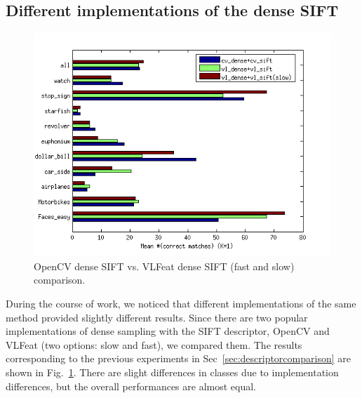 \documentclass[review]{elsarticle}
\begin{document}
%
\subsection{Different implementations of the dense {SIFT}}
%
%
\begin{figure}[h]
  \begin{center}
    \includegraphics[width=0.6\linewidth]{resources/antti_results/fast_VS_slow_vlfeat/metaPar_NumOfMatchAvgMean.png}
\caption{OpenCV dense SIFT vs. VLFeat dense SIFT (fast and slow) comparison.
\label{fig:densecomparison}}
\end{center}
\end{figure}
%
During the course of work, we noticed that different implementations
of the same method provided slightly different results. Since there are two
popular implementations of dense sampling with the SIFT descriptor,
OpenCV and VLFeat (two options: slow and fast), we compared them.
The results corresponding to the previous experiments in 
Sec~\ref{sec:descriptorcomparison}
are shown in Fig.~\ref{fig:densecomparison}. 
There are slight differences in classes due to implementation
differences, but the overall performances are almost equal.

%
\end{document}
